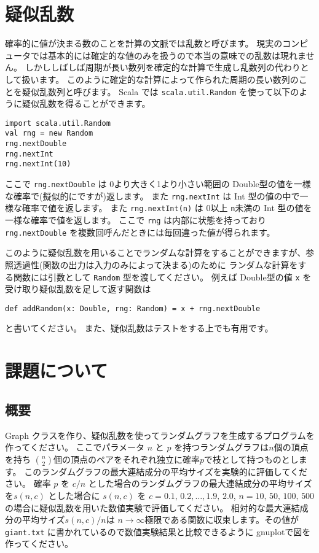 \documentclass[a4paper,twoside,onecolumn,openany,article]{memoir}
\theoremstyle{remark}
\begin{document}
\section{疑似乱数}
確率的に値が決まる数のことを計算の文脈では乱数と呼びます。
現実のコンピュータでは基本的には確定的な値のみを扱うので本当の意味での乱数は現れません。
しかししばしば周期が長い数列を確定的な計算で生成し乱数列の代わりとして扱います。
このように確定的な計算によって作られた周期の長い数列のことを疑似乱数列と呼びます。
Scala では \texttt{scala.util.Random} を使って以下のように疑似乱数を得ることができます。
\begin{verbatim}
import scala.util.Random
val rng = new Random
rng.nextDouble
rng.nextInt
rng.nextInt(10)
\end{verbatim}
ここで \texttt{rng.nextDouble} は 0より大きく1より小さい範囲の Double型の値を一様な確率で(擬似的にですが)返します。
また \texttt{rng.nextInt} は Int 型の値の中で一様な確率で値を返します。
また \texttt{rng.nextInt(n)} は 0以上 \texttt{n}未満の Int 型の値を一様な確率で値を返します。
ここで \texttt{rng} は内部に状態を持っており \texttt{rng.nextDouble} を複数回呼んだときには毎回違った値が得られます。

このように疑似乱数を用いることでランダムな計算をすることができますが、参照透過性(関数の出力は入力のみによって決まる)のために
ランダムな計算をする関数には引数として \texttt{Random} 型を渡してください。
例えば Double型の値 \texttt{x} を受け取り疑似乱数を足して返す関数は
\begin{verbatim}
def addRandom(x: Double, rng: Random) = x + rng.nextDouble
\end{verbatim}
と書いてください。
また、疑似乱数はテストをする上でも有用です。

\section{課題について}
\subsection{概要}
Graph クラスを作り、疑似乱数を使ってランダムグラフを生成するプログラムを作ってください。
ここでパラメータ $n$ と $p$ を持つランダムグラフは$n$個の頂点を持ち $\binom{n}{2}$個の頂点のペアをそれぞれ独立に確率$p$で枝として持つものとします。
このランダムグラフの最大連結成分の平均サイズを実験的に評価してください。
確率 $p$ を $c/n$ とした場合のランダムグラフの最大連結成分の平均サイズを$s(n,c)$ とした場合に $s(n,c)$ を $c=0.1,\, 0.2,\dotsc, 1.9,\, 2.0$, $n=10,\, 50,\, 100,\, 500$
の場合に疑似乱数を用いた数値実験で評価してください。
相対的な最大連結成分の平均サイズ$s(n,c)/n$は $n\to\infty$極限である関数に収束します。その値が\texttt{giant.txt} に書かれているので数値実験結果と比較できるように gnuplotで図を作ってください。
\end{document}
